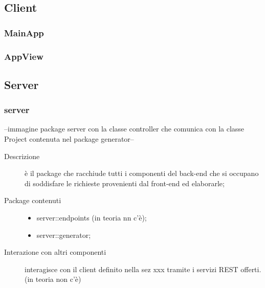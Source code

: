 





\subsection{Client}

\subsubsection{MainApp}

\subsubsection{AppView}





\subsection{Server}
\subsubsection{server}
--immagine package server con la classe controller che comunica con la classe Project contenuta nel package generator--
\begin{description}
\item[Descrizione] è il package che racchiude tutti i componenti del back-end che si occupano di soddisfare le richieste provenienti dal front-end ed elaborarle;
\item[Package contenuti] 
	\begin{itemize}
	\item server::endpoints (in teoria nn c'è);
	\item server::generator;
	\end{itemize}
\item[Interazione con altri componenti] interagisce con il client definito nella sez xxx tramite i servizi REST offerti. (in teoria non c'è)
\end{description}


